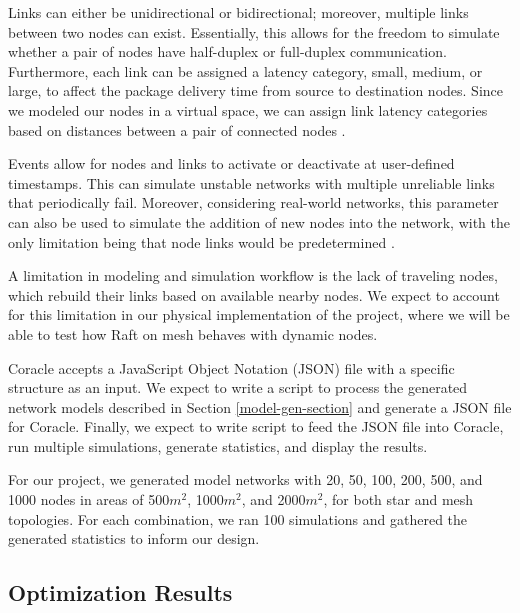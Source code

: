 Links can either be unidirectional or bidirectional; moreover, multiple links between two nodes can exist. Essentially, this allows for the freedom to simulate whether a pair of nodes have half-duplex or full-duplex communication. Furthermore, each link can be assigned a latency category, small, medium, or large, to affect the package delivery time from source to destination nodes. Since we modeled our nodes in a virtual space, we can assign link latency categories based on distances between a pair of connected nodes \cite{howardCoracleEvaluatingConsensus2015}.

Events allow for nodes and links to activate or deactivate at user-defined timestamps. This can simulate unstable networks with multiple unreliable links that periodically fail. Moreover, considering real-world networks, this parameter can also be used to simulate the addition of new nodes into the network, with the only limitation being that node links would be predetermined \cite{howardCoracleEvaluatingConsensus2015}. 

A limitation in modeling and simulation workflow is the lack of traveling nodes, which rebuild their links based on available nearby nodes. We expect to account for this limitation in our physical implementation of the project, where we will be able to test how Raft on mesh behaves with dynamic nodes.

Coracle accepts a JavaScript Object Notation (JSON) file with a specific structure as an input. We expect to write a  script to process the generated network models described in Section \ref{model-gen-section} and generate a JSON file for Coracle. Finally, we expect to write  script to feed the JSON file into Coracle, run multiple simulations, generate statistics, and display the results. 

For our project, we generated model networks with 20, 50, 100, 200, 500, and 1000 nodes in areas of 500$m^2$, 1000$m^2$, and 2000$m^2$, for both star and mesh topologies. For each combination, we ran 100 simulations and gathered the generated statistics to inform our design.



\vspace{-5pt}
\subsection{Optimization Results}

